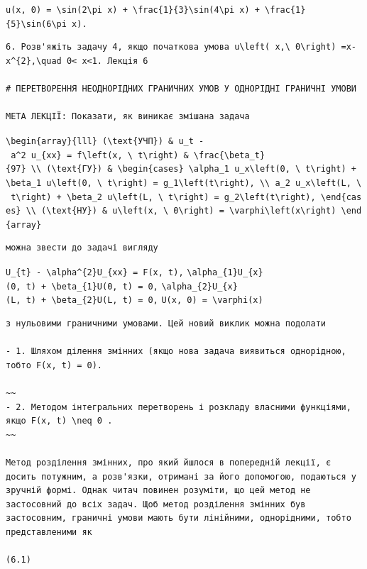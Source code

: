 \documentclass[
  ukrainian,
]{article}
\begin{document}
\texttt{u(x,\ 0)\ =\ \textbackslash{}sin(2\textbackslash{}pi\ x)\ +\ \textbackslash{}frac\{1\}\{3\}\textbackslash{}sin(4\textbackslash{}pi\ x)\ +\ \textbackslash{}frac\{1\}\{5\}\textbackslash{}sin(6\textbackslash{}pi\ x).}

\begin{verbatim}
6. Розв'яжіть задачу 4, якщо початкова умова u\left( x,\ 0\right) =x-x^{2},\quad 0< x<1. Лекція 6

# ПЕРЕТВОРЕННЯ НЕОДНОРІДНИХ ГРАНИЧНИХ УМОВ У ОДНОРІДНІ ГРАНИЧНІ УМОВИ

МЕТА ЛЕКЦІЇ: Показати, як виникає змішана задача
\end{verbatim}

\texttt{\textbackslash{}begin\{array\}\{lll\}\ (\textbackslash{}text\{УЧП\})\ \&\ u\_t\ -\ a\^{}2\ u\_\{xx\}\ =\ f\textbackslash{}left(x,\ \textbackslash{}\ t\textbackslash{}right)\ \&\ \textbackslash{}frac\{\textbackslash{}beta\_t\}\{97\}\ \textbackslash{}\textbackslash{}\ (\textbackslash{}text\{ГУ\})\ \&\ \textbackslash{}begin\{cases\}\ \textbackslash{}alpha\_1\ u\_x\textbackslash{}left(0,\ \textbackslash{}\ t\textbackslash{}right)\ +\ \textbackslash{}beta\_1\ u\textbackslash{}left(0,\ \textbackslash{}\ t\textbackslash{}right)\ =\ g\_1\textbackslash{}left(t\textbackslash{}right),\ \textbackslash{}\textbackslash{}\ a\_2\ u\_x\textbackslash{}left(L,\ \textbackslash{}\ t\textbackslash{}right)\ +\ \textbackslash{}beta\_2\ u\textbackslash{}left(L,\ \textbackslash{}\ t\textbackslash{}right)\ =\ g\_2\textbackslash{}left(t\textbackslash{}right),\ \textbackslash{}end\{cases\}\ \textbackslash{}\textbackslash{}\ (\textbackslash{}text\{HУ\})\ \&\ u\textbackslash{}left(x,\ \textbackslash{}\ 0\textbackslash{}right)\ =\ \textbackslash{}varphi\textbackslash{}left(x\textbackslash{}right)\ \textbackslash{}end\{array\}}

\begin{verbatim}
можна звести до задачі вигляду
\end{verbatim}

\texttt{U\_\{t\}\ -\ \textbackslash{}alpha\^{}\{2\}U\_\{xx\}\ =\ F(x,\ t),}
\texttt{\textbackslash{}alpha\_\{1\}U\_\{x\}(0,\ t)\ +\ \textbackslash{}beta\_\{1\}U(0,\ t)\ =\ 0,}
\texttt{\textbackslash{}alpha\_\{2\}U\_\{x\}(L,\ t)\ +\ \textbackslash{}beta\_\{2\}U(L,\ t)\ =\ 0,}
\texttt{U(x,\ 0)\ =\ \textbackslash{}varphi(x)}

\begin{verbatim}
з нульовими граничними умовами. Цей новий виклик можна подолати

- 1. Шляхом ділення змінних (якщо нова задача виявиться однорідною, тобто F(x, t) = 0).

~~
- 2. Методом інтегральних перетворень і розкладу власними функціями, якщо F(x, t) \neq 0 .
~~

Метод розділення змінних, про який йшлося в попередній лекції, є досить потужним, а розв'язки, отримані за його допомогою, подаються у зручній формі. Однак читач повинен розуміти, що цей метод не застосовний до всіх задач. Щоб метод розділення змінних був застосовним, граничні умови мають бути лінійними, однорідними, тобто представленими як

(6.1)
\end{verbatim}
\end{document}
